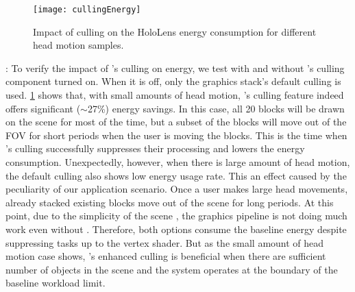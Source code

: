 



\begin{figure}
    \centering
    \vspace{-2ex}
    \texttt{[image: cullingEnergy]}
    \vspace{-2ex}
    \caption{Impact of culling on the HoloLens energy consumption for different head motion samples.}
    \label{fig:culling-energy}
\end{figure}



:
%
To verify the impact of {\myit}'s culling on energy, we test with 
and without {\myit}'s culling component turned on. When it is off, only the 
graphics stack's default culling is used. 
%
\fig\ref{fig:culling-energy} shows that, with small amounts of head motion,
{\myit}'s culling feature indeed offers significant ($\sim$27\%) energy savings.
%
In this case, all 20 blocks will be drawn on the scene for most of the time, 
but a subset of the blocks will move out of the FOV
for short periods when the user is moving the blocks.
This is the time when {\myit}'s culling successfully suppresses their 
processing and lowers the energy consumption. 
%
Unexpectedly, however, when there is large amount of head motion, the default 
culling also shows low energy usage rate.
%
This an effect caused by the peculiarity of our application scenario.
Once a user makes large head movements, already stacked 
existing blocks move out of the scene for long periods.
%
At this point, due to the simplicity of the scene , 
the graphics pipeline is not doing much work even without {\myit}. Therefore, 
both options consume the baseline energy despite {\myit} suppressing tasks up
to the vertex shader.
%
But as the small amount of head motion case shows, {\myit}'s enhanced culling
is beneficial when there are sufficient number of objects in the scene and the
system operates at the boundary of the baseline workload limit.

